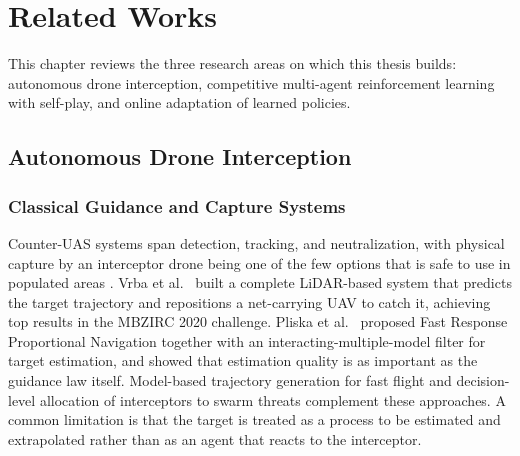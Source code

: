
\chapter{Related Works}
\label{ch:related}

This chapter reviews the three research areas on which this thesis builds: autonomous drone interception, competitive multi-agent reinforcement learning with self-play, and online adaptation of learned policies.

\section{Autonomous Drone Interception}

\subsection{Classical Guidance and Capture Systems}
\noindent
Counter-UAS systems span detection, tracking, and neutralization, with physical capture by an interceptor drone being one of the few options that is safe to use in populated areas \cite{chauhanNationsDefenseComprehensive2025}. Vrba et al.\ \cite{vrbaAutonomousCaptureAgile2022} built a complete LiDAR-based system that predicts the target trajectory and repositions a net-carrying UAV to catch it, achieving top results in the MBZIRC 2020 challenge. Pliska et al.\ \cite{pliskaSafeMidAirDrone2024} proposed Fast Response Proportional Navigation together with an interacting-multiple-model filter for target estimation, and showed that estimation quality is as important as the guidance law itself. Model-based trajectory generation for fast flight \cite{zhouRobustEfficientQuadrotor2019} and decision-level allocation of interceptors to swarm threats \cite{palmasReinforcementLearningDecisionLevel2025} complement these approaches. A common limitation is that the target is treated as a process to be estimated and extrapolated rather than as an agent that reacts to the interceptor.

